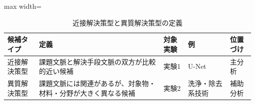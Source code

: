 \begin{table}[tbp]
\centering
\small
\caption{近接解決策型と異質解決策型の定義}
\label{tab:solution_type_definition_table}
\begin{adjustbox}{max width=\textwidth}
\begin{tabular}{lllll}
\toprule
候補タイプ & 定義 & 対象実験 & 例 & 位置づけ \\
\midrule
近接解決策型 & 課題文脈と解決手段文脈の双方が比較的近い候補 & 実験1 & U-Net & 主分析 \\
異質解決策型 & 課題文脈には関連があるが、対象物・材料・分野が大きく異なる候補 & 実験2 & 洗浄・除去系技術 & 補助分析 \\
\bottomrule
\end{tabular}
\end{adjustbox}
\end{table}
